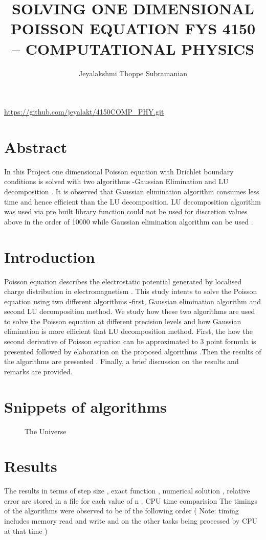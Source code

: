 \documentclass{article}
\title{SOLVING ONE DIMENSIONAL POISSON EQUATION
FYS 4150 – COMPUTATIONAL PHYSICS
}
\author{Jeyalakshmi Thoppe Subramanian }
\begin{document}
\maketitle
\url{https://github.com/jeyalakt/4150COMP_PHY.git}
\section{Abstract}
In this Project one dimensional Poisson equation with Drichlet boundary conditions is solved with two algorithms -Gaussian Elimination and LU decomposition . It is observed that Gaussian elimination algorithm consumes less time and hence efficient than the LU decomposition. LU decomposition algorithm was used via pre built library function could not be used  for discretion values above in the order of 10000 while Gaussian elimination algorithm can be used .

\section{Introduction}
Poisson equation describes the electrostatic potential generated by localised charge distribution in electromagnetism  . This study intents  to solve  the Poisson equation using two different algorithms -first,  Gaussian elimination algorithm and second LU decomposition method.
We study how these two algorithms are used to solve the Poisson equation at different precision levels and how Gaussian elimination is more efficient that LU decomposition method.
First, the how the second derivative of  Poisson equation  can be approximated to 3 point formula is presented followed by elaboration on the proposed algorithms .Then the results of the algorithms are presented . Finally, a brief discussion on the results and remarks are provided.
\section{Snippets of algorithms}
\begin{figure}[h!]

\centering

\caption{The Universe}
\label{fig:universe}
\end{figure}

\section{Results}
The results in terms of step size , exact function , numerical solution , relative error are stored in a file for each value of n .
CPU time comparision 
The timings of the algorithms were observed to be of the following order
( Note: timing  includes memory read and write and on the other tasks being processed by CPU at that time  )
\end{document}
